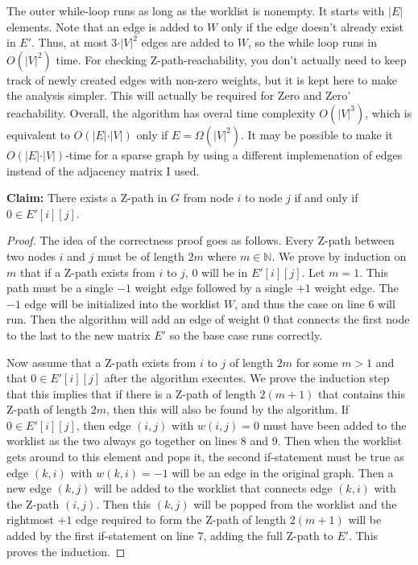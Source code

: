\documentclass[11pt]{article}
\theoremstyle{remark}
\theoremstyle{remark}
\begin{document}
\begin{enumerate}
    The outer while-loop runs as long as the worklist is nonempty. It starts with $\vert E \vert$ elements. Note that an edge is added to $W$ only if the edge doesn't already exist in $E'$. Thus, at most $3\cdot \vert V \vert^2$ edges are added to $W$, so the while loop runs in $O(\vert V \vert^2)$ time. For checking Z-path-reachability, you don't actually need to keep track of newly created edges with non-zero weights, but it is kept here to make the analysis simpler. This will actually be required for Zero and Zero' reachability. Overall, the algorithm has overal time complexity $O(\vert V \vert^3)$, which is equivalent to $O(\vert E \vert \cdot \vert V \vert)$ only if $E=\Omega(\vert V \vert^2)$. It may be possible to make it $O(\vert E \vert \cdot \vert V \vert)$-time for a sparse graph by using a different implemenation of edges instead of the adjacency matrix I used.
    
    \noindent\textbf{Claim:} There exists a Z-path in $G$ from node $i$ to node $j$ if and only if $0 \in E'[i][j]$.
    \begin{proof}
      The idea of the correctness proof goes as follows. Every Z-path between two nodes $i$ and $j$ must be of length $2m$ where $m\in\mathbb{N}$. We prove by induction on $m$ that if a Z-path exists from $i$ to $j$, $0$ will be in $E'[i][j]$. Let $m=1$. This path must be a single $-1$ weight edge followed by a single $+1$ weight edge. The $-1$ edge will be initialized into the worklist $W$, and thus the case on line 6 will run. Then the algorithm will add an edge of weight 0 that connects the first node to the last to the new matrix $E'$ so the base case runs correctly.

      Now assume that a Z-path exists from $i$ to $j$ of length $2m$ for some $m>1$ and that $0\in E'[i][j]$ after the algorithm executes. We prove the induction step that this implies that if there is a Z-path of length $2(m+1)$ that contains this Z-path of length $2m$, then this will also be found by the algorithm. If $0\in E'[i][j]$, then edge $(i,j)$ with $w(i,j)=0$ must have been added to the worklist as the two always go together on lines 8 and 9. Then when the worklist gets around to this element and pops it, the second if-statement must be true as edge $(k,i)$ with $w(k,i)=-1$ will be an edge in the original graph. Then a new edge $(k,j)$ will be added to the worklist that connects edge $(k,i)$ with the Z-path $(i,j)$. Then this $(k,j)$ will be popped from the worklist and the rightmost $+1$ edge required to form the Z-path of length $2(m+1)$ will be added by the first if-statement on line 7, adding the full Z-path to $E'$. This proves the induction.


\end{proof}
\end{enumerate}
\end{document}

